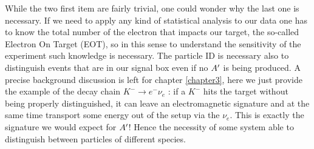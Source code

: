 While the two first item are fairly trivial, one could wonder why the last one is necessary. If we need to apply any kind of statistical analysis to our data one has to know the total number of the electron that impacts our target, the so-called Electron On Target (EOT), so in this sense to understand the sensitivity of the experiment such knowledge is necessary. The particle ID is necessary also to distinguish events that are in our signal box even if no $A'$ is being produced. A precise background discussion is left for chapter \ref{chapter3}, here we just provide the example of the decay chain $K^- \to e^- \nu_e$ \cite{review-particle-physics}: if a $K^-$ hits the target without being properly distinguished, it can leave an electromagnetic signature and at the same time transport some energy out of the setup via the $\nu_e$. This is exactly the signature we would expect for $A'$! Hence the necessity of some system able to distinguish between particles of different species.


